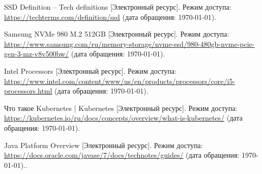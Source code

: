 \begin{thebibliography}{}
	SSD Definition -- Tech definitions [Электронный ресурс].
	\newblock Режим доступа: \url{https://techterms.com/definition/ssd}
	(дата обращения: \today).
	
	Samsung NVMe 980 M.2 512GB [Электронный ресурс].
	\newblock Режим доступа:
	\url{https://www.samsung.com/ru/memory-storage/nvme-ssd/980-480gb-nvme-pcie-gen-3-mz-v8v500bw/}
	(дата обращения: \today).
	
	Intel Processors [Электронный ресурс].
	\newblock Режим доступа:
	\url{https://www.intel.com/content/www/us/en/products/processors/core/i5-processors.html}
	(дата обращения: \today).
	
	Что такое Kubernetes | Kubernetes [Электронный
	ресурс].
	\newblock Режим доступа:
	\url{https://kubernetes.io/ru/docs/concepts/overview/what-is-kubernetes/}
	(дата обращения: \today).

	Java Platform Overview [Электронный ресурс].
	\newblock Режим доступа:
	\url{https://docs.oracle.com/javase/7/docs/technotes/guides/} (дата обращения: \today)..
	
\end{thebibliography}
\endgroup